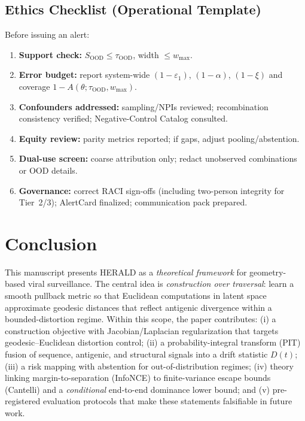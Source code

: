 \documentclass[11pt]{article}
\begin{document}
\subsection{Ethics Checklist (Operational Template)}
Before issuing an alert:
\begin{enumerate}[leftmargin=*, itemsep=2pt, topsep=2pt]
\item \textbf{Support check:} $S_{\text{OOD}}\le\tau_{\text{OOD}}$, width $\le w_{\max}$.
\item \textbf{Error budget:} report system-wide $(1-\varepsilon_1)$, $(1-\alpha)$, $(1-\xi)$ and coverage $1-A(\theta;\tau_{\text{OOD}},w_{\max})$.
\item \textbf{Confounders addressed:} sampling/NPIs reviewed; recombination consistency verified; Negative-Control Catalog consulted.
\item \textbf{Equity review:} parity metrics reported; if gaps, adjust pooling/abstention.
\item \textbf{Dual-use screen:} coarse attribution only; redact unobserved combinations or OOD details.
\item \textbf{Governance:} correct RACI sign-offs (including two-person integrity for Tier 2/3); AlertCard finalized; communication pack prepared.
\end{enumerate}

\section{Conclusion}
This manuscript presents \textsc{HERALD} as a \emph{theoretical framework} for geometry-based viral surveillance. The central idea is \emph{construction over traversal}: learn a smooth pullback metric so that Euclidean computations in latent space approximate geodesic distances that reflect antigenic divergence within a bounded-distortion regime. Within this scope, the paper contributes: (i) a construction objective with Jacobian/Laplacian regularization that targets geodesic--Euclidean distortion control; (ii) a probability-integral transform (PIT) fusion of sequence, antigenic, and structural signals into a drift statistic $D(t)$; (iii) a risk mapping with abstention for out-of-distribution regimes; (iv) theory linking margin-to-separation (InfoNCE) to finite-variance escape bounds (Cantelli) and a \emph{conditional} end-to-end dominance lower bound; and (v) pre-registered evaluation protocols that make these statements falsifiable in future work.
\end{document}
